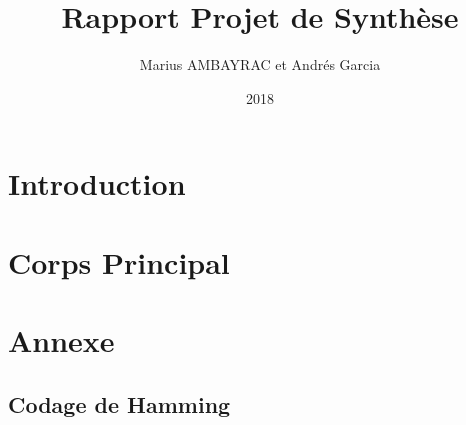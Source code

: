 \documentclass[a4paper,12pt,french]{article}
\begin{document}
\title{Rapport Projet de Synthèse}
\author{Marius AMBAYRAC et Andrés Garcia}
\date{2018}
\maketitle
\clearpage

\section{Introduction}



\section{Corps Principal}
	
	
 	
\section{Annexe}
	\subsection{Codage de Hamming}
	\begin{code}
	
	\end{code}
\end{document}
